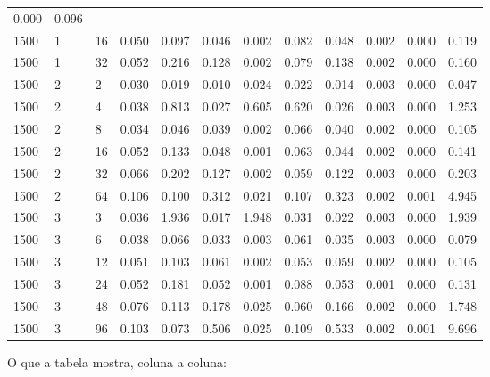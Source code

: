 \begin{longtable}[]{@{}llllllllllll@{}}
0.000 & 0.096 \\
1500 & 1 & 16 & 0.050 & 0.097 & 0.046 & 0.002 & 0.082 & 0.048 & 0.002 &
0.000 & 0.119 \\
1500 & 1 & 32 & 0.052 & 0.216 & 0.128 & 0.002 & 0.079 & 0.138 & 0.002 &
0.000 & 0.160 \\
1500 & 2 & 2 & 0.030 & 0.019 & 0.010 & 0.024 & 0.022 & 0.014 & 0.003 &
0.000 & 0.047 \\
1500 & 2 & 4 & 0.038 & 0.813 & 0.027 & 0.605 & 0.620 & 0.026 & 0.003 &
0.000 & 1.253 \\
1500 & 2 & 8 & 0.034 & 0.046 & 0.039 & 0.002 & 0.066 & 0.040 & 0.002 &
0.000 & 0.105 \\
1500 & 2 & 16 & 0.052 & 0.133 & 0.048 & 0.001 & 0.063 & 0.044 & 0.002 &
0.000 & 0.141 \\
1500 & 2 & 32 & 0.066 & 0.202 & 0.127 & 0.002 & 0.059 & 0.122 & 0.003 &
0.000 & 0.203 \\
1500 & 2 & 64 & 0.106 & 0.100 & 0.312 & 0.021 & 0.107 & 0.323 & 0.002 &
0.001 & 4.945 \\
1500 & 3 & 3 & 0.036 & 1.936 & 0.017 & 1.948 & 0.031 & 0.022 & 0.003 &
0.000 & 1.939 \\
1500 & 3 & 6 & 0.038 & 0.066 & 0.033 & 0.003 & 0.061 & 0.035 & 0.003 &
0.000 & 0.079 \\
1500 & 3 & 12 & 0.051 & 0.103 & 0.061 & 0.002 & 0.053 & 0.059 & 0.002 &
0.000 & 0.105 \\
1500 & 3 & 24 & 0.052 & 0.181 & 0.052 & 0.001 & 0.088 & 0.053 & 0.001 &
0.000 & 0.131 \\
1500 & 3 & 48 & 0.076 & 0.113 & 0.178 & 0.025 & 0.060 & 0.166 & 0.002 &
0.000 & 1.748 \\
1500 & 3 & 96 & 0.103 & 0.073 & 0.506 & 0.025 & 0.109 & 0.533 & 0.002 &
0.001 & 9.696 \\
\end{longtable}

O que a tabela mostra, coluna a coluna:

